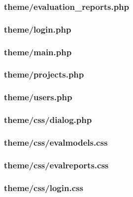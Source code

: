 \documentclass[12pt,a4paper,spanish,twoside]{article}
\begin{document}
\subsubsection{theme/evaluation\_reports.php}


\subsubsection{theme/login.php}


\subsubsection{theme/main.php}


\subsubsection{theme/projects.php}


\subsubsection{theme/users.php}


\subsubsection{theme/css/dialog.php}


\subsubsection{theme/css/evalmodels.css}


\subsubsection{theme/css/evalreports.css}


\subsubsection{theme/css/login.css}

\end{document}
